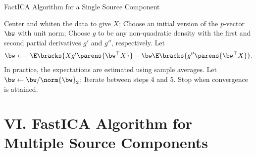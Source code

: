 \documentclass[12pt]{article}
\begin{document}
\begin{enumerate}[label=\textbf{\arabic*.}]
	\begin{minipage}{\linewidth}
		\begin{algorithm}[H]
		\caption{FactICA Algorithm for a Single Source Component}\label{algo-fastica-single}
		\begin{algorithmic}[1]
		\STATE Center and whiten the data to give $X$; 
		\STATE Choose an initial version of the $p$-vector $\bw$ with unit norm; 
		\STATE Choose $g$ to be any non-quadratic density with the first and second partial derivatives $g'$ and $g''$, respectively. 
		\STATE Let 
		\begin{align*}
			\bw \longleftarrow \E \bracks{X g' \parens{\bw^\top X}} - \bw \E \bracks{ g'' \parens{\bw^\top X}}. 
		\end{align*}
		In practice, the expectations are estimated using sample averages. 
		\STATE Let $\bw \leftarrow \bw / \norm{\bw}_2$; 
		\STATE Iterate between steps 4 and 5. Stop when convergence is attained. 
		\end{algorithmic}
		\end{algorithm}
	\end{minipage}


\end{enumerate}


\section*{VI. FastICA Algorithm for Multiple Source Components}
\end{document}
